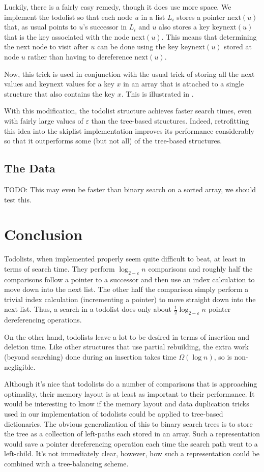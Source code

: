 \documentclass[lotsofwhite]{patmorin}
\newcommand{\eps}{\varepsilon}
\begin{document}
Luckily, there is a fairly easy remedy, though it does use more space.
We implement the todolist so that each node $u$ in a list $L_i$ stores
a pointer $\mathrm{next}(u)$ that, as usual points to $u$'s successor
in $L_i$ and $u$ also stores a key $\mathrm{keynext}(u)$ that is the
key associated with the node $\mathrm{next}(u)$.  This means that
determining the next node to visit after $u$ can be done using the
key $\mathrm{keynext}(u)$ stored at node $u$ rather than having to
dereference $\mathrm{next}(u)$.

Now, this trick is used in conjunction with the usual trick of storing all
the $\mathrm{next}$ values and $\mathrm{keynext}$ values for a key $x$
in an array that is attached to a single structure that also contains
the key $x$.  This is illustrated in .

With this modification, the todolist structure achieves faster search
times, even with fairly large values of $\eps$ than the tree-based
structures. Indeed, retrofitting this idea into the skiplist
implementation improves its performance considerably so that it
outperforms some (but not all) of the tree-based structures.

\subsection{The Data}

TODO: This may even be faster than binary search on a sorted array, we should test this.

\section{Conclusion}

Todolists, when implemented properly seem quite difficult to beat, at
least in terms of search time.  They perform $\log_{2-\eps} n$ comparisons
and roughly half the comparisons follow a pointer to a successor
and then use an index calculation to move down into the next list.
The other half the comparison simply perform a trivial index calculation
(incrementing a pointer) to move straight down into the next list.
Thus, a search in a todolist does only about $\frac{1}{2}\log_{2-\eps}
n$ pointer dereferencing operations.

On the other hand, todolists leave a lot to be desired in terms of
insertion and deletion time.  Like other structures that use partial
rebuilding, the extra work (beyond searching) done during an insertion
takes time $\Omega(\log n)$, so is non-negligible.  

Although it's nice that todolists do a number of comparisons that is
approaching optimality, their memory layout is at least as important to
their performance.  It would be interesting to know if the memory layout
and data duplication tricks used in our implementation of todolists could
be applied to tree-based dictionaries.  The obvious generalization of this
to binary search trees is to store the tree as a collection of left-paths
each stored in an array. Such a representation would save a pointer
dereferencing operation each time the search path went to a left-child.
It's not immediately clear, however, how such a representation could be
combined with a tree-balancing scheme.
\end{document}

